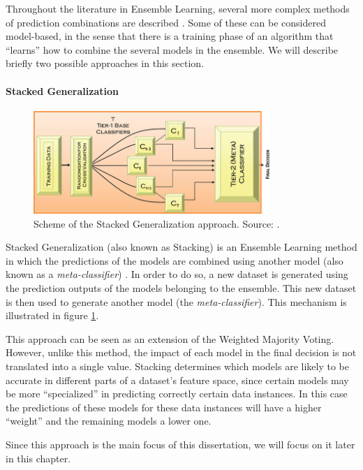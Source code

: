 Throughout the literature in Ensemble Learning, several more complex methods of prediction combinations are described \cite{Polikar2012a}.
Some of these can be considered model-based, in the sense that there is a training phase of an algorithm that ``learns'' how to combine the several models in the ensemble.
We will describe briefly two possible approaches in this section.

\paragraph{Stacked Generalization}\mbox{}

\begin{figure}[ht!]
	\centering
	\includegraphics[width=0.8\textwidth]{figures/stacking}
	\caption{Scheme of the Stacked Generalization approach. Source: \cite{Polikar2012a}.}
	\label{fig:stacking}
\end{figure}

Stacked Generalization (also known as Stacking) is an Ensemble Learning method in which the predictions of the models are combined using another model (also known as a \textit{meta-classifier}) \cite{Polikar2012a}. In order to do so, a new dataset is generated using the prediction outputs of the models belonging to the ensemble.
This new dataset is then used to generate another model (the \textit{meta-classifier}).
This mechanism is illustrated in figure \ref{fig:stacking}.

This approach can be seen as an extension of the Weighted Majority Voting.
However, unlike this method, the impact of each model in the final decision is not translated into a single value.
Stacking determines which models are likely to be accurate in different parts of a dataset's feature space, since certain models may be more ``specialized'' in predicting correctly certain data instances.
In this case the predictions of these models for these data instances will have a higher ``weight'' and the remaining models a lower one.

Since this approach is the main focus of this dissertation, we will focus on it later in this chapter.

